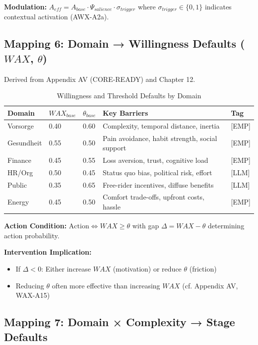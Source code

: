 \textbf{Modulation:} $A_{eff} = A_{base} \cdot \Psi_{salience} \cdot \sigma_{trigger}$ where $\sigma_{trigger} \in \{0,1\}$ indicates contextual activation (AWX-A2a).


\subsection{Mapping 6: Domain → Willingness Defaults ($WAX$, $\theta$)}

Derived from Appendix AV (CORE-READY) and Chapter 12.

\begin{table}[htbp]
\centering
\caption{Willingness and Threshold Defaults by Domain}
\label{tab:ggg-willingness-mapping}
\renewcommand{\arraystretch}{1.3}
\begin{tabular}{@{}lllp{4cm}l@{}}
\toprule
\textbf{Domain} & \textbf{$WAX_{base}$} & \textbf{$\theta_{base}$} & \textbf{Key Barriers} & \textbf{Tag} \\
\midrule
Vorsorge & 0.40 & 0.60 & Complexity, temporal distance, inertia & [EMP] \\
Gesundheit & 0.55 & 0.50 & Pain avoidance, habit strength, social support & [EMP] \\
Finance & 0.45 & 0.55 & Loss aversion, trust, cognitive load & [EMP] \\
HR/Org & 0.50 & 0.45 & Status quo bias, political risk, effort & [LLM] \\
Public & 0.35 & 0.65 & Free-rider incentives, diffuse benefits & [LLM] \\
Energy & 0.45 & 0.50 & Comfort trade-offs, upfront costs, hassle & [EMP] \\
\bottomrule
\end{tabular}
\end{table}

\textbf{Action Condition:} $\text{Action} \Leftrightarrow WAX \geq \theta$ with gap $\Delta = WAX - \theta$ determining action probability.

\textbf{Intervention Implication:}
\begin{itemize}[nosep]
\item If $\Delta < 0$: Either increase $WAX$ (motivation) or reduce $\theta$ (friction)
\item Reducing $\theta$ often more effective than increasing $WAX$ (cf. Appendix AV, WAX-A15)
\end{itemize}


\subsection{Mapping 7: Domain × Complexity → Stage Defaults}

